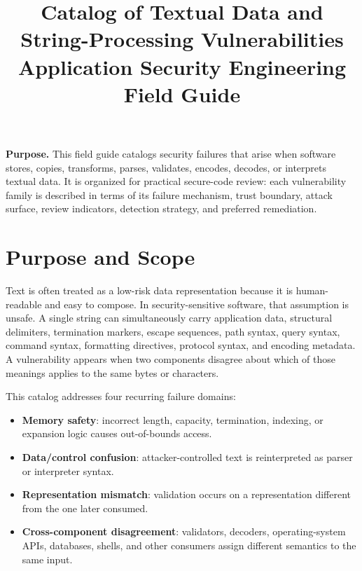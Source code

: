 \documentclass[11pt]{article}
\title{\textbf{Catalog of Textual Data and String-Processing Vulnerabilities}\\[0.4em]
\large Application Security Engineering Field Guide}
\author{}
\date{}
\begin{document}
\maketitle

\begin{center}
\begin{minipage}{0.92\textwidth}
\small
\textbf{Purpose.} This field guide catalogs security failures that arise when software stores, copies, transforms, parses, validates, encodes, decodes, or interprets textual data. It is organized for practical secure-code review: each vulnerability family is described in terms of its failure mechanism, trust boundary, attack surface, review indicators, detection strategy, and preferred remediation.
\end{minipage}
\end{center}

\tableofcontents
\newpage

\section{Purpose and Scope}

Text is often treated as a low-risk data representation because it is human-readable and easy to compose. In security-sensitive software, that assumption is unsafe. A single string can simultaneously carry application data, structural delimiters, termination markers, escape sequences, path syntax, query syntax, command syntax, formatting directives, protocol syntax, and encoding metadata. A vulnerability appears when two components disagree about which of those meanings applies to the same bytes or characters.

This catalog addresses four recurring failure domains:

\begin{itemize}
  \item \textbf{Memory safety}: incorrect length, capacity, termination, indexing, or expansion logic causes out-of-bounds access.
  \item \textbf{Data/control confusion}: attacker-controlled text is reinterpreted as parser or interpreter syntax.
  \item \textbf{Representation mismatch}: validation occurs on a representation different from the one later consumed.
  \item \textbf{Cross-component disagreement}: validators, decoders, operating-system APIs, databases, shells, and other consumers assign different semantics to the same input.
\end{itemize}
\end{document}
